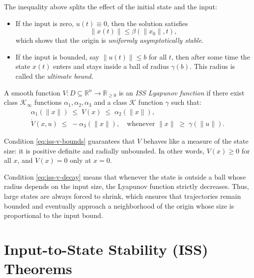 \begin{remark}
The inequality above splits the effect of the initial state and the input:
\begin{itemize}
    \item If the input is zero, $u(t)\equiv 0$, then the solution satisfies
    \[
    \|x(t)\| \leq \beta(\|x_0\|,t),
    \]
    which shows that the origin is \emph{uniformly asymptotically stable}.
    \item If the input is bounded, say $\|u(t)\|\leq b$ for all $t$, then after some time the state $x(t)$ enters and stays inside a ball of radius $\gamma(b)$. This radius is called the \emph{ultimate bound}.
\end{itemize}
\end{remark}

\begin{definition}
A smooth function $V:D \subseteq \mathbb{R}^n \to \mathbb{R}_{\ge 0}$ is an \emph{ISS Lyapunov function} if there exist class $\mathcal{K}_\infty$ functions $\alpha_1, \alpha_2, \alpha_3$ and a class $\mathcal{K}$ function $\gamma$ such that:
\begin{align}
    \alpha_1(\|x\|) \;\leq\; V(x) \;\leq\; \alpha_2(\|x\|), \label{eq:iss-v-bounds}\\[6pt]
    \dot V(x,u) \;\leq\; -\alpha_3(\|x\|), 
    \quad \text{whenever } \|x\| \;\geq\; \gamma(\|u\|). \label{eq:iss-v-decay}
\end{align}
\end{definition}

\begin{remark}
Condition \eqref{eq:iss-v-bounds} guarantees that $V$ behaves like a measure of the state size: it is positive definite and radially unbounded. In other words, $V(x)\ge 0$ for all $x$, and $V(x)=0$ only at $x=0$.
\end{remark}

\begin{remark}
Condition \eqref{eq:iss-v-decay} means that whenever the state is outside a ball whose radius depends on the input size, the Lyapunov function strictly decreases. 
Thus, large states are always forced to shrink, which ensures that trajectories remain bounded and eventually approach a neighborhood of the origin whose size is proportional to the input bound.
\end{remark}

\section{Input-to-State Stability (ISS) Theorems}

